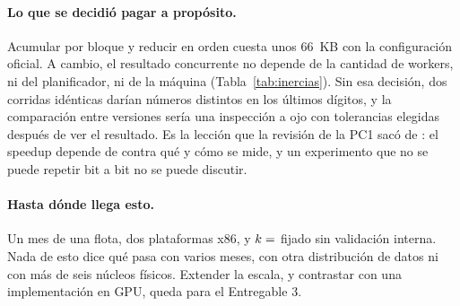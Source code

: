 \paragraph{Lo que se decidió pagar a propósito.} Acumular por bloque y reducir en orden cuesta unos
66~KB con la configuración oficial. A cambio, el resultado concurrente no depende de la cantidad de
workers, ni del planificador, ni de la máquina (Tabla~\ref{tab:inercias}). Sin esa decisión, dos
corridas idénticas darían números distintos en los últimos dígitos, y la comparación entre versiones
sería una inspección a ojo con tolerancias elegidas después de ver el resultado. Es la lección que la
revisión de la PC1 sacó de \textcite{bellavita2025}: el speedup depende de contra qué y cómo se mide,
y un experimento que no se puede repetir bit a bit no se puede discutir.

\paragraph{Hasta dónde llega esto.} Un mes de una flota, dos plataformas x86,
y $k = \cifra{k}$ fijado sin validación interna. Nada de esto dice qué pasa con varios meses, con
otra distribución de datos ni con más de seis núcleos físicos. Extender la escala, y contrastar con una implementación en
GPU, queda para el Entregable 3.
